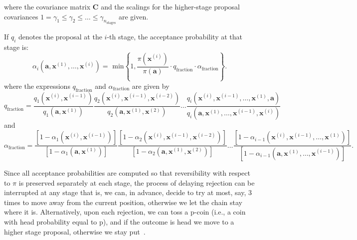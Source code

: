 where the covariance matrix $\mathbf{C}$ and the scalings for the higher-stage proposal covariances $1=\gamma_1\leqslant\gamma_2\leqslant\ldots\leqslant\gamma_{n_{\text{stages}}}$ are given.


If $q_i$ denotes the proposal at the $i$-th stage, the acceptance probability at that stage is:
\begin{equation}\label{eq-alphas}
\alpha_i(\mathbf{a},\mathbf{x}^{(1)},\ldots,\mathbf{x}^{(i)}) = \text{ min}
\left\{1,
\frac {\pi(\mathbf{x}^{(i)})}{\pi(\mathbf{a})} \cdot q_{\text{fraction}} \cdot \alpha_{\text{fraction}}
\right\}.
\end{equation}
where the expressions $q_{\text{fraction}}$ and $\alpha_{\text{fraction}}$ are given by
\begin{equation*}
q_{\text{fraction}}=
\frac{q_1(\mathbf{x}^{(i)},\mathbf{x}^{(i-1)})}{q_1(\mathbf{a},\mathbf{x}^{(1)})}
\frac{q_2(\mathbf{x}^{(i)},\mathbf{x}^{(i-1)},\mathbf{x}^{(i-2)})}{q_2(\mathbf{a},\mathbf{x}^{(1)},\mathbf{x}^{(2)})}
\ldots
\frac{q_i(\mathbf{x}^{(i)},\mathbf{x}^{(i-1)},\ldots,\mathbf{x}^{(1)},\mathbf{a})}{q_i(\mathbf{a},\mathbf{x}^{(1)},\ldots,\mathbf{x}^{(i-1)},\mathbf{x}^{(i)})}
\end{equation*}
and
\begin{equation*}
\alpha_{\text{fraction}}=
\frac{[1-\alpha_1(\mathbf{x}^{(i)},\mathbf{x}^{(i-1)})]}{[1-\alpha_1(\mathbf{a},\mathbf{x}^{(1)})]}
\frac{[1-\alpha_2(\mathbf{x}^{(i)},\mathbf{x}^{(i-1)},\mathbf{x}^{(i-2)})]}{[1-\alpha_2(\mathbf{a},\mathbf{x}^{(1)},\mathbf{x}^{(2)})]}
\ldots
\frac{[1-\alpha_{i-1}(\mathbf{x}^{(i)},\mathbf{x}^{(i-1)},\ldots,\mathbf{x}^{(1)})]}{[1-\alpha_{i-1}(\mathbf{a},\mathbf{x}^{(1)},\ldots,\mathbf{x}^{(i-1)})]}.
\end{equation*}


Since all acceptance probabilities are computed so that reversibility with respect to $\pi$ is preserved separately at each
stage, the process of delaying rejection can be interrupted at any stage that is, we can, in advance, decide to try at
most, say, 3 times to move away from the current position,
otherwise we let the chain stay where it is. Alternatively,
upon each rejection, we can toss a p-coin (i.e., a coin with
head probability equal to p), and if the outcome is head we
move to a higher stage proposal, otherwise we stay put~\cite{HaLaMiSa06}.


